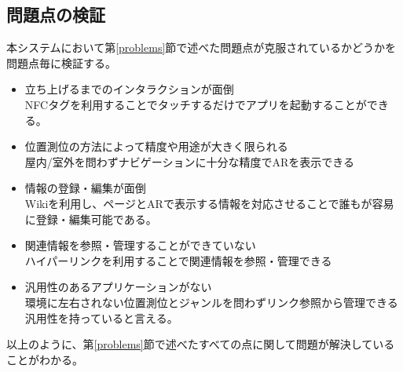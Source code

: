 \subsection{問題点の検証}
本システムにおいて第\ref{problems}節で述べた問題点が克服されているかどうかを問題点毎に検証する。
\begin{itemize}
  \item 立ち上げるまでのインタラクションが面倒 \\
  NFCタグを利用することでタッチするだけでアプリを起動することができる。
  \item 位置測位の方法によって精度や用途が大きく限られる \\
  屋内/室外を問わずナビゲーションに十分な精度でARを表示できる
  \item 情報の登録・編集が面倒 \\
  Wikiを利用し、ページとARで表示する情報を対応させることで誰もが容易に登録・編集可能である。
  \item 関連情報を参照・管理することができていない \\
  ハイパーリンクを利用することで関連情報を参照・管理できる
  \item 汎用性のあるアプリケーションがない \\
  環境に左右されない位置測位とジャンルを問わずリンク参照から管理できる汎用性を持っていると言える。
\end{itemize}
以上のように、第\ref{problems}節で述べたすべての点に関して問題が解決していることがわかる。